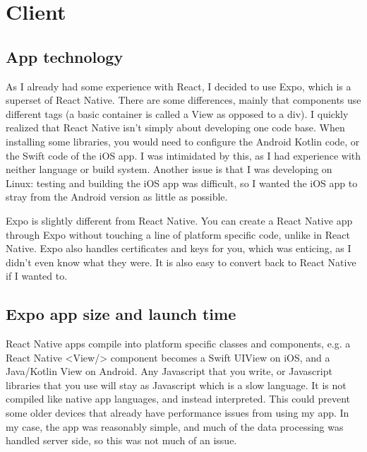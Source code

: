 \documentclass{l4proj}
\begin{document}
\section{Client}
\subsection{App technology}
As I already had some experience with React, I decided to use Expo, which is a superset of React Native. There are some differences, mainly that components use different tags (a basic container is called a View as opposed to a div). I quickly realized that React Native isn't simply about developing one code base. When installing some libraries, you would need to configure the Android Kotlin code, or the Swift code of the iOS app. I was intimidated by this, as I had experience with neither language or build system. Another issue is that I was developing on Linux: testing and building the iOS app was difficult, so I wanted the iOS app to stray from the Android version as little as possible.

Expo is slightly different from React Native. You can create a React Native app through Expo without touching a line of platform specific code, unlike in React Native. Expo also handles certificates and keys for you, which was enticing, as I didn't even know what they were. It is also easy to convert back to React Native if I wanted to. 

\subsection{Expo app size and launch time}
React Native apps compile into platform specific classes and components, e.g. a React Native <View/> component becomes a Swift UIView on iOS, and a Java/Kotlin View on Android. Any Javascript that you write, or Javascript libraries that you use will stay as Javascript which is a slow language. It is not compiled like native app languages, and instead interpreted. This could prevent some older devices that already have performance issues from using my app. In my case, the app was reasonably simple, and much of the data processing was handled server side, so this was not much of an issue. 
\end{document}
